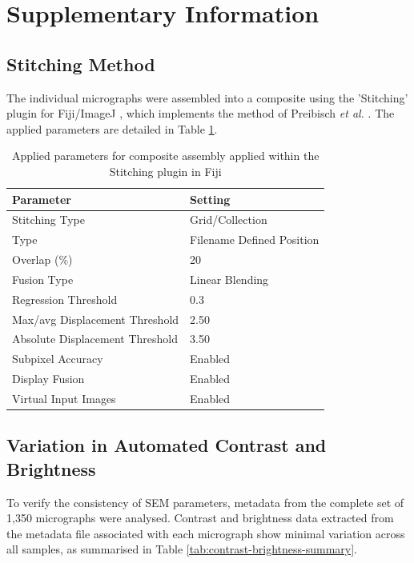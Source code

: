 \documentclass[review]{elsarticle}
\begin{document}
\section{Supplementary Information}

\subsection{Stitching Method}

The individual micrographs were assembled into a composite using the 'Stitching'
plugin for Fiji/ImageJ \citep{schindelin2012fiji}, which implements the method
of Preibisch \textit{et al.} \citep{Preibisch2009}. The applied parameters are detailed in
Table \ref{tab:stitching_parameters}.

\begin{table}[hbtp]
	\centering
	\caption{Applied parameters for composite assembly applied within the Stitching plugin in Fiji}
	\label{tab:stitching_parameters}
	\begin{tabular}{l l}
		\hline
		Parameter & Setting \\
		\hline
		Stitching Type                    & Grid/Collection \\
		Type               & Filename Defined Position \\
		Overlap (\%)  & 20 \\
		Fusion Type &  Linear Blending \\
		Regression Threshold            & 0.3 \\
		Max/avg Displacement Threshold            & 2.50 \\
		Absolute Displacement Threshold            & 3.50 \\
		Subpixel Accuracy & Enabled\\
		Display Fusion & Enabled\\
		Virtual Input Images & Enabled\\
		\hline
	\end{tabular}%
\end{table}

\subsection{Variation in Automated Contrast and Brightness}

To verify the consistency of SEM parameters, metadata from the complete set of
1,350 micrographs were analysed. Contrast and brightness data extracted from the
metadata file associated with each micrograph show minimal variation across
all samples, as summarised in Table \ref{tab:contrast-brightness-summary}.
\end{document}
